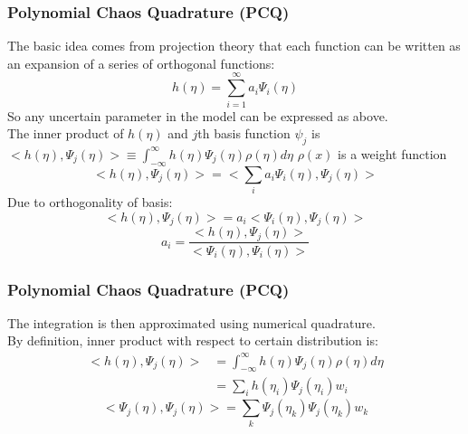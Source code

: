 \documentclass[10pt]{beamer}
\begin{document}
\begin{frame}
\frametitle{Polynomial Chaos Quadrature (PCQ)}
The basic idea comes from projection theory that each function can be written as an expansion of a series of orthogonal functions:\\
\begin{equation}
     h(\eta)= \sum_{i=1}^\infty a_i \Psi_i (\eta) \label{eq:pcq-expansion}  
\end{equation}
So any uncertain parameter in the model can be expressed as above. \\
The inner product of $h(\eta)$ and $j$th basis function $\psi_j$ is $<h(\eta), \Psi_j (\eta) > \equiv \int_{-\infty}^{\infty} h(\eta) \Psi_j (\eta) \rho(\eta) d \eta $ $\rho(x)$ is a weight function
\begin{equation}
     <h(\eta), \Psi_j (\eta) >= <\sum_i a_i \Psi_i (\eta), \Psi_j (\eta)>\label{eq:pcq-inner-product}
\end{equation}
Due to orthogonality of basis:
\begin{equation}
     <h(\eta), \Psi_j (\eta) >= a_i<\Psi_i (\eta), \Psi_j (\eta)> \label{eq:pcq-inner-product-orthogonal}
\end{equation}
\begin{equation}
     a_i= \frac{<h(\eta), \Psi_j (\eta) >}{<\Psi_i (\eta), \Psi_i (\eta)>}\label{eq:pcq-coef}
\end{equation}
\end{frame}
\begin{frame}
\frametitle{Polynomial Chaos Quadrature (PCQ)}
The integration is then approximated using numerical quadrature.\\
By definition, inner product with respect to certain distribution is:
\begin{equation}
\begin{split}
      <h(\eta), \Psi_j (\eta) > &= \int_{-\infty}^{\infty} h(\eta) \Psi_j (\eta) \rho(\eta) d \eta \\
      &= \sum_i h(\eta_i) \Psi_j (\eta_i) w_i 
\end{split} \label{eq:pcq-gaussian-h} 
\end{equation}
\begin{equation}
      <\Psi_j (\eta), \Psi_j (\eta) > = \sum_k \Psi_j (\eta_k) \Psi_j (\eta_k) w_k \label{eq:pcq-gaussian-psi} 
\end{equation}
\end{frame}
\end{document}
